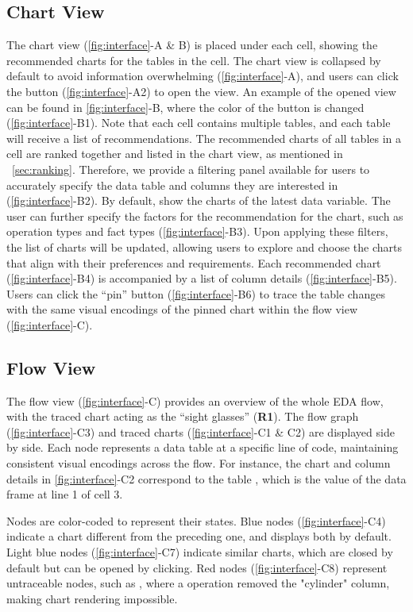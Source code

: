 \subsection{Chart View}
The chart view (\autoref{fig:interface}-A \& B) is placed under each cell, showing the recommended charts for the tables in the cell. 
The chart view is collapsed by default to avoid information overwhelming (\autoref{fig:interface}-A), and users can click the button (\autoref{fig:interface}-A2) to open the view. 
An example of the opened view can be found in \autoref{fig:interface}-B, where the color of the button is changed (\autoref{fig:interface}-B1).
Note that each cell contains multiple tables, and each table will receive a list of recommendations.
The recommended charts of all tables in a cell are ranked together and listed in the chart view, as mentioned in ~\autoref{sec:ranking}.
Therefore, we provide a filtering panel available for users to accurately specify the data table and columns they are interested in (\autoref{fig:interface}-B2). 
By default, \system{} show the charts of the latest data variable. 
The user can further specify the factors for the recommendation for the chart, such as operation types and fact types (\autoref{fig:interface}-B3). 
Upon applying these filters, the list of charts will be updated, allowing users to explore and choose the charts that align with their preferences and requirements.
Each recommended chart (\autoref{fig:interface}-B4) is accompanied by a list of column details (\autoref{fig:interface}-B5).
Users can click the ``pin'' button (\autoref{fig:interface}-B6) to trace the table changes with the same visual encodings of the pinned chart within the flow view (\autoref{fig:interface}-C). 


\subsection{Flow View}
The flow view (\autoref{fig:interface}-C) provides an overview of the whole EDA flow, with the traced chart acting as the ``sight glasses'' (\textbf{R1}). The flow graph (\autoref{fig:interface}-C3) and traced charts (\autoref{fig:interface}-C1 \& C2) are displayed side by side. Each node represents a data table at a specific line of code, maintaining consistent visual encodings across the flow. For instance, the chart and column details in \autoref{fig:interface}-C2 correspond to the table , which is the value of the data frame  at line 1 of cell 3.

Nodes are color-coded to represent their states. Blue nodes (\autoref{fig:interface}-C4) indicate a chart different from the preceding one, and \system{} displays both by default. Light blue nodes (\autoref{fig:interface}-C7) indicate similar charts, which are closed by default but can be opened by clicking. Red nodes (\autoref{fig:interface}-C8) represent untraceable nodes, such as , where a  operation removed the "cylinder" column, making chart rendering impossible.

